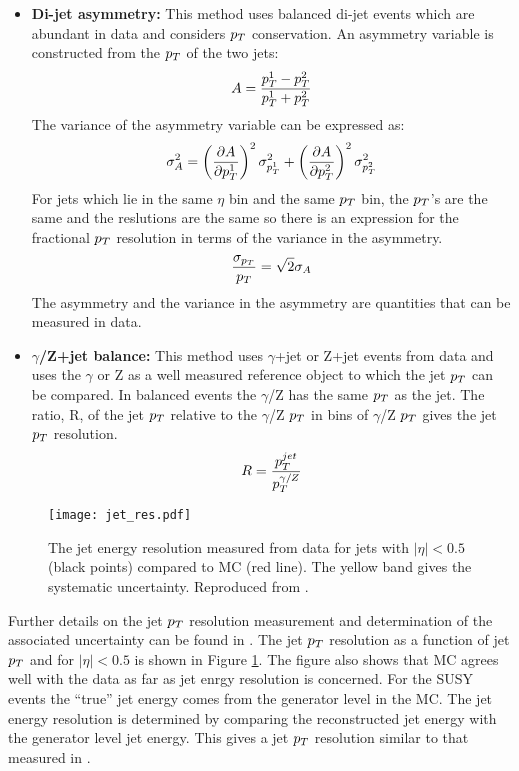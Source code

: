 \begin{itemize}
\item {\bf Di-jet asymmetry:} This method uses balanced di-jet events which are 
abundant in data and considers $p_{T}$ conservation. An asymmetry variable is 
constructed from the $p_{T}$ of the two jets:
\begin{equation}
A = \frac{p_{T}^{1} - p_{T}^{2}}{p_{T}^{1} + p_{T}^{2}}
\end{equation}
The variance of the asymmetry variable can be expressed as:
\begin{equation}
\sigma_{A}^{2} = \left(\frac{\partial A}{\partial
p_{T}^{1}}\right)^{2}\sigma_{p_{T}^{1}}^{2} + \left(\frac{\partial A}{\partial
p_{T}^{2}}\right)^{2}\sigma_{p_{T}^{2}}^{2}
\end{equation}
For jets which lie in the same $\eta$ bin and the same $p_{T}$ bin, the $p_{T}$'s
are the same and the reslutions are the same so there is an expression for the
fractional $p_{T}$ resolution in terms of the variance in the asymmetry.
\begin{equation}
\frac{\sigma_{p_{T}}}{p_{T}} = \sqrt{2}\sigma_{A}
\end{equation}  
The asymmetry and the variance in the asymmetry are quantities that can be 
measured in data.
\item {\bf $\gamma$/Z+jet balance:} This method uses $\gamma$+jet or Z+jet
events from data and uses the $\gamma$ or Z as a well measured reference object
to which the jet $p_{T}$ can be compared. In balanced events the $\gamma$/Z has 
the same $p_{T}$ as the jet. The ratio, R, of the jet $p_{T}$ relative to the 
$\gamma$/Z $p_{T}$ in bins of $\gamma$/Z $p_{T}$ gives the jet $p_{T}$ resolution. 
\begin{equation}
R = \frac{p_{T}^{jet}}{p_{T}^{\gamma/Z}}
\end{equation}
\end{itemize}

\begin{figure}
\begin{center}
\texttt{[image: jet\_res.pdf]}
\end{center}
\caption{The jet energy resolution measured from data for jets with $|\eta| <
0.5$ (black points) compared to MC (red line). The yellow band gives the
systematic uncertainty. Reproduced from \cite{jec}.}
\label{fig:jet_res}
\end{figure}

Further details on the jet $p_{T}$ resolution measurement and determination of the
associated uncertainty can be found in \cite{jec}. The jet $p_{T}$ resolution as a
function of jet $p_{T}$ and for $|\eta| < 0.5$ is shown in Figure
\ref{fig:jet_res}. The figure also shows that MC agrees well with the
data as far as jet enrgy resolution is concerned. For the SUSY events the 
``true'' jet energy comes from the generator level in the MC. The jet energy 
resolution is determined by comparing the reconstructed jet energy with the 
generator level jet energy. This gives a jet $p_{T}$ resolution similar to that 
measured in \cite{jec}. \\

